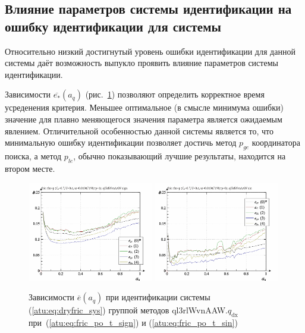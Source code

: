 



\subsection{Влияние параметров системы идентификации на ошибку идентификации для системы }  %

Относительно низкий достигнутый уровень ошибки идентификации
для данной системы даёт возможность выпукло проявить влияние
параметров системы идентификации.


Зависимости $\overline{e_*}(a_q)$ (рис.~\ref{atu:f:fric_a_q_ql3rlWvnAAW_q_dx})
позволяют определить корректное время усреденения критерия.
Меньшее оптимальное (в смысле минимума ошибки) значение
для плавно меняющегося значения параметра является ожидаемым явлением.
Отличительной особенностью данной системы является то,
что минимальную ошибку идентификации позволяет достичь метод
$p_{ge}$ координатора поиска, а метод $p_{le}$,
обычно показывающий лучшие результаты,
находится на втором месте.

\begin{figure}[htb!]
  \centerline{
    \includegraphics[width=0.49\textwidth]{p/cha/fric/ql3rlWvnAAW/fric_id-p_a_q_sign.png}
    \hfill
    \includegraphics[width=0.49\textwidth]{p/cha/fric/ql3rlWvnAAW/fric_id-p_a_q_sin.png}
  }
  \caption{Зависимости $\overline{e}(a_q)$ при идентификации системы (\ref{atu:eq:dryfric_sys}) группой методов ql3rlWvnAAW.$q_\mathrm{dx}$
   при~(\ref{atu:eq:fric_po_t_sign}) и (\ref{atu:eq:fric_po_t_sin})}
  \label{atu:f:fric_a_q_ql3rlWvnAAW_q_dx}
\end{figure}


